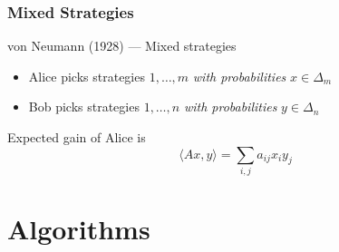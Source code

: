 \documentclass[aspectratio=149]{beamer}
\begin{document}
\begin{frame}
  \frametitle{Mixed Strategies}
  \begin{block}{von Neumann (1928) --- Mixed strategies}
    \begin{itemize}
      \item Alice picks strategies $1, \dots, m$ \emph{with probabilities} $x\in \Delta_m$
      \item Bob picks strategies $1, \dots, n$ \emph{with probabilities} $y\in \Delta_n$
    \end{itemize}
    Expected gain of Alice is
    \begin{equation}
      \langle Ax, y \rangle = \sum_{i,j} a_{ij} x_i y_j
    \end{equation}
  \end{block}
\end{frame}

\section{Algorithms}%
\label{sec:}
\end{document}
